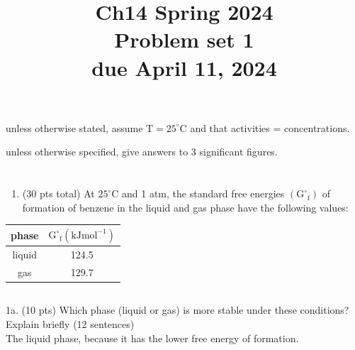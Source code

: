 \documentclass[12 pt]{article}
\title{Ch14 Spring 2024 \\
 Problem set 1 \\
 due April 11, 2024 }
\author{}
\date{}
\begin{document}
\maketitle
unless otherwise stated, assume $\mathrm{T}=25^{\circ} \mathrm{C}$ and that activities = concentrations.

unless otherwise specified, give answers to 3 significant figures.

\section{}
\begin{enumerate}
  \item (30 pts total) At $25^{\circ} \mathrm{C}$ and 1 atm, the standard free energies $\left(\mathrm{G}^{\circ}{ }_{\mathrm{f}}\right)$ of formation of benzene in the liquid and gas phase have the following values:
\end{enumerate}

\begin{center}
\begin{tabular}{|c|c|}
\hline
phase & $\mathrm{G}^{\circ}{ }_{\mathrm{f}}\left(\mathrm{kJ} \mathrm{mol}^{-1}\right)$ \\
\hline
liquid & 124.5 \\
\hline
gas & 129.7 \\
\hline
\end{tabular}
\end{center}

\subsection{}
1a. (10 pts) Which phase (liquid or gas) is more stable under these conditions? Explain briefly (12 sentences)\\
The liquid phase, because it has the lower free energy of formation.
\end{document}
